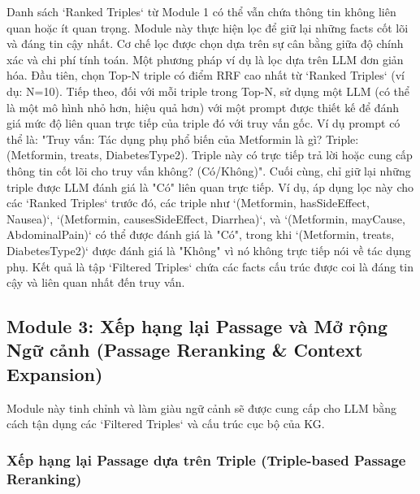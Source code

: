 \documentclass[../main.tex]{subfiles}
\begin{document}
Danh sách `Ranked Triples` từ Module 1 có thể vẫn chứa thông tin không liên quan hoặc ít quan trọng. Module này thực hiện lọc để giữ lại những facts cốt lõi và đáng tin cậy nhất. Cơ chế lọc được chọn dựa trên sự cân bằng giữa độ chính xác và chi phí tính toán. Một phương pháp ví dụ là lọc dựa trên LLM đơn giản hóa. Đầu tiên, chọn Top-N triple có điểm RRF cao nhất từ `Ranked Triples` (ví dụ: N=10). Tiếp theo, đối với mỗi triple trong Top-N, sử dụng một LLM (có thể là một mô hình nhỏ hơn, hiệu quả hơn) với một prompt được thiết kế để đánh giá mức độ liên quan trực tiếp của triple đó với truy vấn gốc. Ví dụ prompt có thể là: "Truy vấn: Tác dụng phụ phổ biến của Metformin là gì? Triple: (Metformin, treats, DiabetesType2). Triple này có trực tiếp trả lời hoặc cung cấp thông tin cốt lõi cho truy vấn không? (Có/Không)". Cuối cùng, chỉ giữ lại những triple được LLM đánh giá là "Có" liên quan trực tiếp. Ví dụ, áp dụng lọc này cho các `Ranked Triples` trước đó, các triple như `(Metformin, hasSideEffect, Nausea)`, `(Metformin, causesSideEffect, Diarrhea)`, và `(Metformin, mayCause, AbdominalPain)` có thể được đánh giá là "Có", trong khi `(Metformin, treats, DiabetesType2)` được đánh giá là "Không" vì nó không trực tiếp nói về tác dụng phụ. Kết quả là tập `Filtered Triples` chứa các facts cấu trúc được coi là đáng tin cậy và liên quan nhất đến truy vấn.

\subsection{Module 3: Xếp hạng lại Passage và Mở rộng Ngữ cảnh (Passage Reranking \& Context Expansion)}

Module này tinh chỉnh và làm giàu ngữ cảnh sẽ được cung cấp cho LLM bằng cách tận dụng các `Filtered Triples` và cấu trúc cục bộ của KG.

\subsubsection{Xếp hạng lại Passage dựa trên Triple (Triple-based Passage Reranking)}
\end{document}
